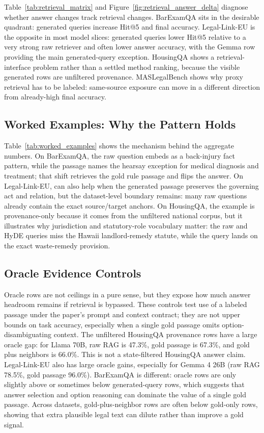 Table~\ref{tab:retrieval_matrix} and Figure~\ref{fig:retrieval_answer_delta}
diagnose whether answer changes track retrieval changes. BarExamQA sits in the
desirable quadrant: generated queries increase Hit@5 and final accuracy.
Legal-Link-EU is the opposite in most model slices: generated queries lower
Hit@5 relative to a very strong raw retriever and often lower answer accuracy,
with the Gemma \hyre{} row providing the main generated-query exception.
HousingQA shows a retrieval-interface problem rather than a settled method
ranking, because the visible generated rows are unfiltered provenance.
MASLegalBench shows why proxy retrieval has to be labeled: same-source exposure
can move in a different direction from already-high final accuracy.

\subsection{Worked Examples: Why the Pattern Holds}



Table~\ref{tab:worked_examples} shows the mechanism behind the aggregate
numbers. On BarExamQA, the raw question embeds as a back-injury fact pattern,
while the \hyre{} passage names the hearsay exception for medical diagnosis and
treatment; that shift retrieves the gold rule passage and flips the answer.
On Legal-Link-EU, \hyre{} can also help when the generated passage preserves
the governing act and relation, but the dataset-level boundary remains: many
raw questions already contain the exact source/target anchors. On HousingQA,
the example is provenance-only because it comes from the unfiltered national
corpus, but it illustrates why jurisdiction and statutory-role vocabulary
matter: the raw and HyDE queries miss the Hawaii landlord-remedy statute, while
the \hyre{} query lands on the exact waste-remedy provision.

\FloatBarrier

\subsection{Oracle Evidence Controls}

Oracle rows are not ceilings in a pure sense, but they expose how much answer
headroom remains if retrieval is bypassed. These controls test use of a labeled
passage under the paper's prompt and context contract; they are not upper bounds
on task accuracy, especially when a single gold passage omits
option-disambiguating context. The unfiltered HousingQA provenance rows have a
large oracle gap: for Llama 70B, raw RAG is 47.3\%, gold passage is 67.3\%,
and gold plus neighbors is 66.0\%. This is not a state-filtered HousingQA
answer claim. Legal-Link-EU also has large oracle gains, especially for Gemma
4 26B (raw RAG 78.5\%, gold passage 96.0\%).
BarExamQA is different: oracle rows are only slightly above or sometimes below
generated-query rows, which suggests that answer selection and option reasoning
can dominate the value of a single gold passage. Across datasets,
gold-plus-neighbor rows are often below gold-only rows, showing that extra
plausible legal text can dilute rather than improve a gold signal.


